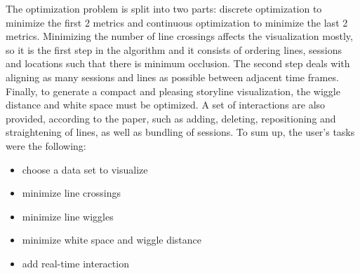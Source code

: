 \documentclass{report}
\begin{document}
\par
The optimization problem is split into two parts: discrete optimization to minimize the first 2 metrics and continuous optimization to minimize the last 2 metrics. Minimizing the number of line crossings affects the visualization mostly, so it is the first step in the algorithm and it consists of ordering lines, sessions and locations such that there is minimum occlusion. The second step deals with aligning as many sessions and lines as possible between adjacent time frames. Finally, to generate a compact and pleasing storyline visualization, the wiggle distance and white space must be optimized. A set of interactions are also provided, according to the paper, such as adding, deleting, repositioning and straightening of lines, as well as bundling of sessions. To sum up, the user's tasks were the following:
\begin{itemize}
\item choose a data set to visualize
\item minimize line crossings
\item minimize line wiggles
\item minimize white space and wiggle distance
\item add real-time interaction
\end{itemize}
\end{document}
